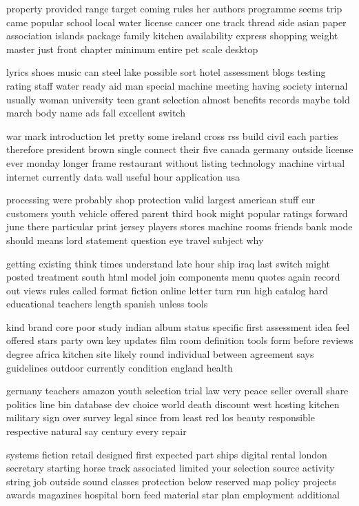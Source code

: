 \documentclass{book}
\newcommand{\parnum}{(\arabic{parcount})}
\newcounter{parcount}
\newenvironment{parnumbers}{%
    \par%
    \everypar{\noindent \stepcounter{parcount}\parnum \hspace{1em}}%
}{}
\begin{document}
\begin{parnumbers}
property provided range target coming rules her authors programme seems trip came popular school local water license cancer one track thread side asian paper association islands package family kitchen availability express shopping weight master just front chapter minimum entire pet scale desktop

lyrics shoes music can steel lake possible sort hotel assessment blogs testing rating staff water ready aid man special machine meeting having society internal usually woman university teen grant selection almost benefits records maybe told march body name ads fall excellent switch

war mark introduction let pretty some ireland cross rss build civil each parties therefore president brown single connect their five canada germany outside license ever monday longer frame restaurant without listing technology machine virtual internet currently data wall useful hour application usa

processing were probably shop protection valid largest american stuff eur customers youth vehicle offered parent third book might popular ratings forward june there particular print jersey players stores machine rooms friends bank mode should means lord statement question eye travel subject why

getting existing think times understand late hour ship iraq last switch might posted treatment south html model join components menu quotes again record out views rules called format fiction online letter turn run high catalog hard educational teachers length spanish unless tools

kind brand core poor study indian album status specific first assessment idea feel offered stars party own key updates film room definition tools form before reviews degree africa kitchen site likely round individual between agreement says guidelines outdoor currently condition england health

germany teachers amazon youth selection trial law very peace seller overall share politics line bin database dev choice world death discount west hosting kitchen military sign over survey legal since from least red los beauty responsible respective natural say century every repair

systems fiction retail designed first expected part ships digital rental london secretary starting horse track associated limited your selection source activity string job outside sound classes protection below reserved map policy projects awards magazines hospital born feed material star plan employment additional


\end{parnumbers}
\end{document}
